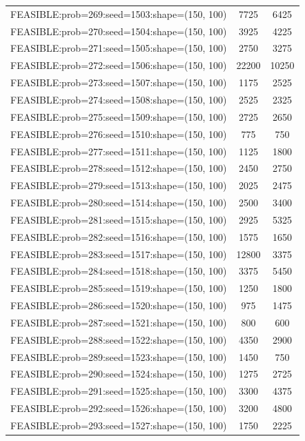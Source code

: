 \begin{longtable}{lcc}
FEASIBLE:prob=269:seed=1503:shape=(150, 100) &     7725 &  6425 \\
FEASIBLE:prob=270:seed=1504:shape=(150, 100) &     3925 &  4225 \\
FEASIBLE:prob=271:seed=1505:shape=(150, 100) &     2750 &  3275 \\
FEASIBLE:prob=272:seed=1506:shape=(150, 100) &    22200 & 10250 \\
FEASIBLE:prob=273:seed=1507:shape=(150, 100) &     1175 &  2525 \\
FEASIBLE:prob=274:seed=1508:shape=(150, 100) &     2525 &  2325 \\
FEASIBLE:prob=275:seed=1509:shape=(150, 100) &     2725 &  2650 \\
FEASIBLE:prob=276:seed=1510:shape=(150, 100) &      775 &   750 \\
FEASIBLE:prob=277:seed=1511:shape=(150, 100) &     1125 &  1800 \\
FEASIBLE:prob=278:seed=1512:shape=(150, 100) &     2450 &  2750 \\
FEASIBLE:prob=279:seed=1513:shape=(150, 100) &     2025 &  2475 \\
FEASIBLE:prob=280:seed=1514:shape=(150, 100) &     2500 &  3400 \\
FEASIBLE:prob=281:seed=1515:shape=(150, 100) &     2925 &  5325 \\
FEASIBLE:prob=282:seed=1516:shape=(150, 100) &     1575 &  1650 \\
FEASIBLE:prob=283:seed=1517:shape=(150, 100) &    12800 &  3375 \\
FEASIBLE:prob=284:seed=1518:shape=(150, 100) &     3375 &  5450 \\
FEASIBLE:prob=285:seed=1519:shape=(150, 100) &     1250 &  1800 \\
FEASIBLE:prob=286:seed=1520:shape=(150, 100) &      975 &  1475 \\
FEASIBLE:prob=287:seed=1521:shape=(150, 100) &      800 &   600 \\
FEASIBLE:prob=288:seed=1522:shape=(150, 100) &     4350 &  2900 \\
FEASIBLE:prob=289:seed=1523:shape=(150, 100) &     1450 &   750 \\
FEASIBLE:prob=290:seed=1524:shape=(150, 100) &     1275 &  2725 \\
FEASIBLE:prob=291:seed=1525:shape=(150, 100) &     3300 &  4375 \\
FEASIBLE:prob=292:seed=1526:shape=(150, 100) &     3200 &  4800 \\
FEASIBLE:prob=293:seed=1527:shape=(150, 100) &     1750 &  2225 \\

\end{longtable}
